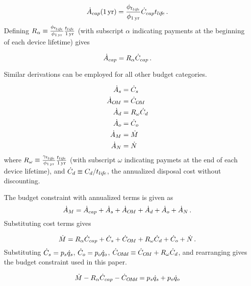 \begin{equation}
  \dot{A}_{cap} (1\,\mathrm{yr}) = \frac{\phi_{t_{li\!f\!e}}}{\phi_{1\,\mathrm{yr}}} \dot{C}_{cap} t_{li\!f\!e} \, .
\end{equation}
%
Defining $R_\alpha \equiv \frac{\phi_{t_{li\!f\!e}}}{\phi_{1\,\mathrm{yr}}} \frac{t_{li\!f\!e}}{1\,\mathrm{yr}}$ 
(with subscript $\alpha$ indicating payments at the beginning of each 
device lifetime) gives

\begin{equation}
  \dot{A}_{cap} = R_\alpha \dot{C}_{cap} \, .
\end{equation}

Similar derivations can be employed for all other budget categories.

\begin{align}
  \dot{A}_s &= \dot{C}_s \\
  \dot{A}_{O\!M} &= \dot{C}_{O\!M} \\
  \dot{A}_d &= R_\omega \dot{C}_d \\
  \dot{A}_o &= \dot{C}_o \\
  \dot{A}_M &= \dot{M} \\
  \dot{A}_N &= \dot{N}
\end{align}
%
where 
$R_\omega \equiv \frac{\gamma_{t_{li\!f\!e}}}{\phi_{1\,\mathrm{yr}}} \frac{t_{li\!f\!e}}{1\,\mathrm{yr}}$
(with subscript $\omega$ indicating paymets 
at the end of each device lifetime), and 
$\dot{C}_d \equiv C_d / t_{li\!f\!e}$, the annualized disposal cost 
without discounting.

The budget constraint with annualized terms is given as
%
\begin{equation}
  \dot{A}_M = \dot{A}_{cap} + 
               \dot{A}_s + 
               \dot{A}_{O\!M} + 
               \dot{A}_d + 
               \dot{A}_o + 
               \dot{A}_N \, .
\end{equation}
%
Substituting cost terms gives

\begin{equation}
  \dot{M} = R_\alpha \dot{C}_{cap} + 
             \dot{C}_s + 
             \dot{C}_{O\!M} + 
             R_\omega \dot{C}_d + 
             \dot{C}_o + 
             \dot{N} \, .
\end{equation}
%
Substituting $\dot{C}_s = p_s \dot{q}_s$,  
$\dot{C}_o = p_o \dot{q}_o$, $\dot{C}_{O\!M\!d} \equiv \dot{C}_{O\!M} + R_\omega \dot{C}_d$, and rearranging gives
the budget constraint used in this paper.

\begin{equation}
  \dot{M} - R_\alpha \dot{C}_{cap} - \dot{C}_{O\!M\!d} = p_s \dot{q}_s + p_o \dot{q}_o
\end{equation}

